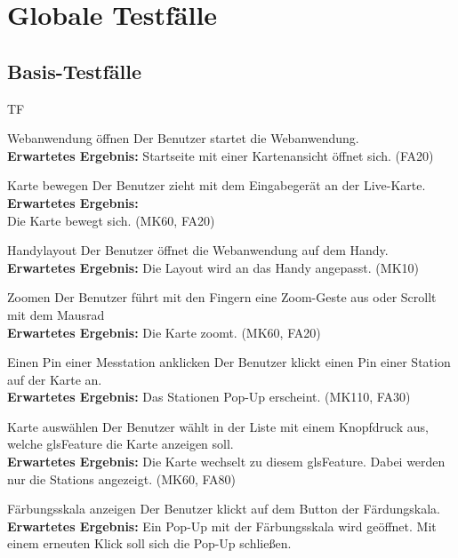 \section{Globale Testfälle}
\setcounter{counter}{10}
\subsection{Basis-Testfälle}
\begin{Kriterien}{TF}

	
			\item[Webanwendung öffnen] Der Benutzer startet die \gls{Webanwendung}. \\ \textbf{Erwartetes Ergebnis:} Startseite mit einer Kartenansicht öffnet sich. (FA20)

	\item[Karte bewegen] Der Benutzer zieht mit dem Eingabegerät an der \gls{Live-Karte}. \textbf{Erwartetes Ergebnis:} \\ Die Karte bewegt sich.  (MK60, FA20)
    
    \item[Handylayout] Der Benutzer öffnet die Webanwendung auf dem Handy. \\ \textbf{Erwartetes Ergebnis:} Die Layout wird an das Handy angepasst. (MK10)
	
	\item[Zoomen] Der Benutzer führt mit den Fingern eine Zoom-Geste aus oder Scrollt mit dem Mausrad \\ \textbf{Erwartetes Ergebnis:} Die Karte zoomt. (MK60, FA20)
	
	\item[Einen Pin einer Messtation anklicken] Der Benutzer klickt einen Pin einer \gls{Station} auf der Karte an. \\ \textbf{Erwartetes Ergebnis:} Das Stationen Pop-Up erscheint. (MK110,  FA30)
	
	\item[Karte auswählen] Der Benutzer wählt in der Liste mit einem Knopfdruck aus, welche gls{Feature} die Karte anzeigen soll. \\ \textbf{Erwartetes Ergebnis:} Die Karte wechselt zu diesem gls{Feature}. Dabei werden nur die \glspl{Station} angezeigt. (MK60, FA80)
	
	\item[Färbungsskala anzeigen] Der Benutzer klickt auf dem Button der Färdungskala. \\ \textbf{Erwartetes Ergebnis:} Ein Pop-Up mit der Färbungsskala wird geöffnet. Mit einem erneuten Klick soll sich die Pop-Up schließen.
	

\end{Kriterien}
